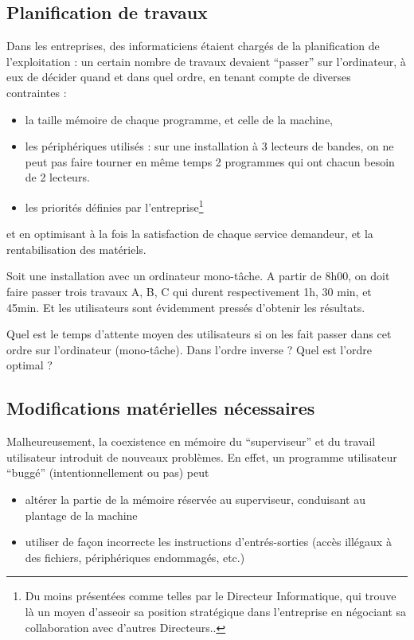 \begin{multicols}{2}
\subsection{Planification de travaux}

Dans les entreprises, des informaticiens étaient chargés de la
planification de l'exploitation : un certain nombre de travaux
devaient ``passer'' sur l'ordinateur, à eux de décider quand et dans
quel ordre, en tenant compte de diverses contraintes :
\begin{itemize}
\item la taille mémoire de chaque programme, et celle de la machine,
\item les périphériques utilisés : sur une installation à 3 lecteurs
  de bandes, on ne peut pas faire tourner en même temps 2 programmes
  qui ont chacun besoin de 2 lecteurs.
\item les priorités définies par l'entreprise\footnote{Du moins
  présentées comme telles par le Directeur Informatique, qui trouve là
  un moyen d'asseoir sa position stratégique dans l'entreprise en négociant
sa collaboration avec d'autres Directeurs..}
\end{itemize}
et en optimisant à la fois la satisfaction de chaque service
demandeur, et la rentabilisation des matériels.

\begin{exercice}
Soit une installation avec un ordinateur mono-tâche.  A partir de 8h00,
on doit faire passer trois travaux A, B, C qui durent respectivement
1h, 30 min, et 45min.  Et les utilisateurs sont évidemment pressés
d'obtenir les résultats.

Quel est le temps d'attente moyen des utilisateurs si on les fait
passer dans cet ordre sur l'ordinateur (mono-tâche).  Dans l'ordre
inverse ?  Quel est l'ordre optimal ?
\end{exercice}


\subsection{Modifications matérielles nécessaires}

Malheureusement, la coexistence en mémoire du ``superviseur'' et du travail
utilisateur introduit de nouveaux problèmes. En effet, un programme
utilisateur ``buggé'' (intentionnellement ou pas) peut
\begin{itemize}
\item altérer la partie de la mémoire réservée au superviseur,
  conduisant au plantage de la machine
\item utiliser de façon incorrecte les instructions d'entrés-sorties
  (accès illégaux à des fichiers, périphériques endommagés, etc.)
\end{itemize}


\end{multicols}
